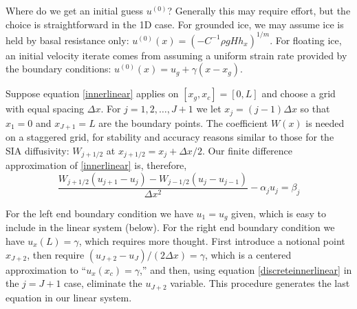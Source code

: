 \documentclass[letterpaper,final,12pt,reqno]{amsart}
\begin{document}
Where do we get an initial guess $u^{(0)}$?  Generally this may require effort, but the choice is straightforward in the 1D case.  For grounded ice, we may assume ice is held by basal resistance only: $u^{(0)}(x) = \left(-C^{-1} \rho g H h_x\right)^{1/m}$.  For floating ice, an initial velocity iterate comes from assuming a uniform strain rate provided by the boundary conditions: $u^{(0)}(x) = u_g + \gamma (x-x_g)$.

Suppose equation \eqref{innerlinear} applies on $[x_g,x_c]=[0,L]$ and choose a grid with equal spacing $\Delta x$.  For $j=1,2,\dots,J+1$ we let $x_j=(j-1)\Delta x$ so that $x_1 = 0$ and $x_{J+1} = L$ are the boundary points.  The coefficient $W(x)$ is needed on a staggered grid, for stability and accuracy reasons similar to those for the SIA diffusivity: $W_{j+1/2}$ at $x_{j+1/2} = x_j + \Delta x/2$.  Our finite difference approximation of \eqref{innerlinear} is, therefore,
\begin{equation}
  \frac{W_{j+1/2} (u_{j+1} - u_j) - W_{j-1/2} (u_{j} - u_{j-1})}{\Delta x^2} - \alpha_j u_j = \beta_j  \label{discreteinnerlinear}
\end{equation}

For the left end boundary condition we have $u_1 = u_g$ given, which is easy to include in the linear system (below).  For the right end boundary condition we have $u_x(L)=\gamma$, which requires more thought.  First introduce a notional point $x_{J+2}$, then require $(u_{J+2} - u_J)/(2 \Delta x) = \gamma$, which is a centered approximation to ``$u_x(x_c)=\gamma$,'' and then, using equation \eqref{discreteinnerlinear} in the $j=J+1$ case, eliminate the $u_{J+2}$ variable.  This procedure generates the last equation in our linear system.
\end{document}
